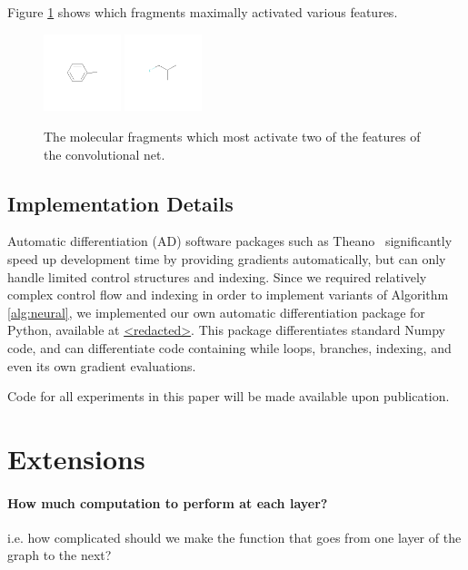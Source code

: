 \documentclass{article}
\begin{document}
Figure \ref{fig:learned features} shows which fragments maximally activated various features.

\begin{figure}[h]
\includegraphics[width=0.2\textwidth]{figures/convnet-features/hidden-unit-0}
\includegraphics[width=0.2\textwidth]{figures/convnet-features/hidden-unit-1}
\caption{The molecular fragments which most activate two of the features of the convolutional net.}
\label{fig:learned features}
\end{figure}

\subsection{Implementation Details}
Automatic differentiation (AD) software packages such as
Theano~\citep{Bastien-Theano-2012, bergstra2010scipy} significantly speed up development time by providing gradients automatically, but can only handle limited control structures and indexing.
Since we required relatively complex control flow and indexing in order to implement variants of Algorithm \ref{alg:neural}, we implemented our own automatic differentiation package for Python, available at \url{<redacted>}.
This package differentiates standard Numpy~\citep{oliphant2007python} code, and can differentiate code containing
while loops, branches, indexing, and even its own gradient evaluations.

Code for all experiments in this paper will be made available upon publication.



\section{Extensions}

\paragraph{How much computation to perform at each layer?}
i.e. how complicated should we make the function that goes from one layer of the graph to the next?
\end{document}
